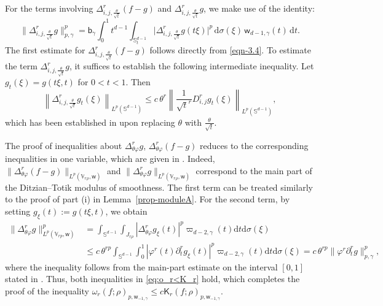 \documentclass{amsart}
\theoremstyle{remark}
\def\d{\mathrm{d}}
\def\g{{\gamma}}
\def\t{{\theta}}
\def\o{{\omega}}
\def\s{\sigma}
\def\SS{{\mathbb S}}
\def\VV{{\mathbb V}}
\def\d{\mathrm{d}}
\def\sK{{\mathsf K}}
\def\sb{{\mathsf b}}
\def\sw{{\mathsf w}}
\def\g{{\gamma}}
\def\t{{\theta}}
\def\o{{\omega}}
\def\s{\sigma}
\def\SS{{\mathbb S}}
\def\VV{{\mathbb V}}
\def\f{\frac}
\def\f{\frac}
\begin{document}
For the terms involving  \(\Delta_{i,j,\f\theta {\sqrt{t}}}^r (f-g)\) and  \(\Delta_{i,j,\f\theta {\sqrt{t}}}^r g\), we make use of the identity:  
$$
\Big \|\Delta_{i,j,\frac{\theta}{\sqrt{t}}}^r g\Big \|_{p,\gamma}^p = \sb_\g \int_0^1 t^{d-1}
   \int_{\mathbb{S}_t^{d-1}} \big|\Delta_{i,j,\frac{\theta}{\sqrt{t}}}^r g(t\xi)\big|^p \, \d\sigma(\xi) \, \sw_{d-1,\gamma}(t) \, \d t.
$$
The first estimate for \(\Delta_{i,j,\frac{\theta}{\sqrt{t}}}^r (f - g)\) follows directly from \eqref{eqn-3.4}.  
To estimate the term \(\Delta_{i,j,\frac{\theta}{\sqrt{t}}}^r g\), it suffices to establish the following intermediate inequality.  
Let \(g_t(\xi) = g(t\xi, t)\) for \(0 < t < 1\). Then  
\[
\left\|\Delta_{i,j,\frac{\theta}{\sqrt{t}}}^r g_t(\xi)\right\|_{L^p(\mathbb{S}^{d-1})} \leq
c\, \theta^r \left\|\frac{1}{\sqrt{t}^r} D_{i,j}^r g_t(\xi)\right\|_{L^p(\mathbb{S}^{d-1})},
\]
which has been established in \cite[Lemma 2.6 (ii)]{DaiX2} upon replacing \(\theta\) with \(\frac{\theta}{\sqrt{t}}\). 


The proof of inequalities about $\Delta_{\t\varphi}^r g$, $\Delta_{\t\varphi}^r (f-g)$
reduces to the corresponding inequalities in one variable, which are given in \cite[p. 58]{DT}. Indeed,
$\|\Delta_{\t\varphi}^r( f - g)\|_{L^p(\VV_{r\rho}, \sw)}$ and $\|\Delta_{\t\varphi}^r g\|_{L^p(\VV_{r\rho}, \sw)}$
correspond to the main part of the Ditzian–Totik modulus of smoothness. The first term can be treated similarly to the proof of part (i) in Lemma~\ref{prop-moduleA}. For the second term, by setting
$g_{\xi}(t) := g(t\xi, t)$, we obtain 
\begin{align*}
\|\Delta_{\t\varphi}^r g\|_{L^p(\VV_{rp},\sw)}^p&=\int_{\SS^{d-1}}\int_{J_{r\rho}} |\Delta_{\t\varphi}^r g_{\xi}(t)|^p \varpi_{d-2,\g}
(t)\d t \d\s(\xi)\\&\leq c\,\t ^{rp}\int_{\SS^{d-1}}\int_0^1 |\varphi^r(t)\partial^r_t g_{\xi}(t)|^p \varpi_{d-2,\g}
(t)\d t \d\s(\xi)  = c\, \t^{rp}\|\varphi^r\partial_t^rg\|^p_{p,\g},
 \end{align*} 
where the inequality follows from the main-part estimate on the interval $[0,1]$ stated in \cite[p. 58]{DT}. Thus, both inequalities
in \eqref{eq:o_r<K_r} hold, which completes the proof of the inequality 
$\o_r(f; \rho)_{p,\sw_{-1,\g}} \leq c \sK_r(f; \rho)_{p,\sw_{-1,\g}}$. 
	
\end{document}

